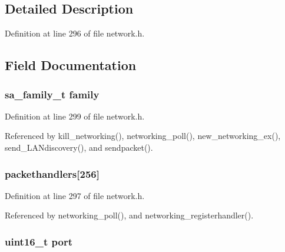 \subsection{Detailed Description}


Definition at line 296 of file network.\+h.



\subsection{Field Documentation}
\hypertarget{struct_networking___core_a59fa33606a579e9080aced9a5d2659de}{
\subsubsection[{family}]{\setlength{\rightskip}{0pt plus 5cm}sa\+\_\+family\+\_\+t family}}\label{struct_networking___core_a59fa33606a579e9080aced9a5d2659de}


Definition at line 299 of file network.\+h.



Referenced by kill\+\_\+networking(), networking\+\_\+poll(), new\+\_\+networking\+\_\+ex(), send\+\_\+\+L\+A\+Ndiscovery(), and sendpacket().

\hypertarget{struct_networking___core_acf65b41b1fc6f52a40016a2329a8ba30}{
\subsubsection[{packethandlers}]{ packethandlers\mbox{[}256\mbox{]}}}\label{struct_networking___core_acf65b41b1fc6f52a40016a2329a8ba30}


Definition at line 297 of file network.\+h.



Referenced by networking\+\_\+poll(), and networking\+\_\+registerhandler().

\hypertarget{struct_networking___core_a8e0798404bf2cf5dabb84c5ba9a4f236}{
\subsubsection[{port}]{\setlength{\rightskip}{0pt plus 5cm}uint16\+\_\+t port}}\label{struct_networking___core_a8e0798404bf2cf5dabb84c5ba9a4f236}


